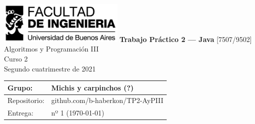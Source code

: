 \documentclass[titlepage,a4paper]{article}
\def \nombreGrupo {Michis y carpinchos (?)}
\begin{document}
\begin{titlepage} %
	\hfill\includegraphics[width=6cm]{img/logofiuba.jpg}
    \centering
    \vfill
    \Huge \textbf{Trabajo Práctico 2 — Java}
    \vskip2cm
    \Large [7507/9502] Algoritmos y Programación III\\
    Curso 2 \\ %
    Segundo cuatrimestre de 2021
    \vfill
    \begin{tabular}{ | l | l | } %
      \hline
      Grupo: & \nombreGrupo \\ \hline
      Repositorio: & github.com/b-haberkon/TP2-AyPIII \\ \hline
      Entrega: & nº 1 (\today) \\ \hline
  	\end{tabular}
    \vfill
    
    \vfill
\end{titlepage}

\tableofcontents %
\newpage



\filbreak %


\newpage


\newpage


\newpage


\newpage


\newpage

\end{document}

